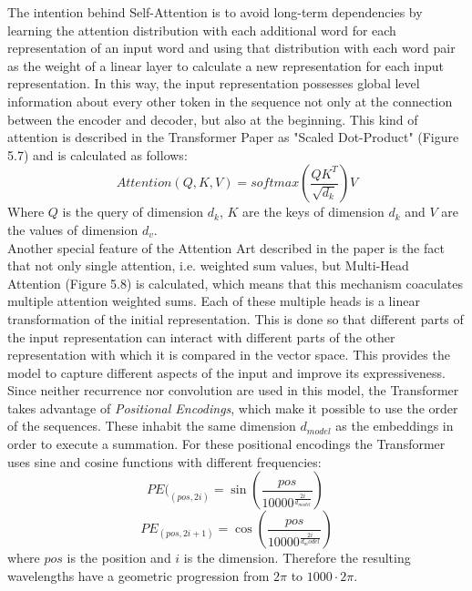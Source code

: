 \documentclass[a4paper, 11pt,titlepage,oneside,openany]{book}
\begin{document}
\noindent The intention behind Self-Attention is to avoid long-term dependencies by learning the attention distribution with each additional word for each representation of an input word and using that distribution with each word pair as the weight of a linear layer to calculate a new representation for each input representation. In this way, the input representation possesses global level information about every other token in the sequence not only at the connection between the encoder and decoder, but also at the beginning. This kind of attention is described in the Transformer Paper as "Scaled Dot-Product" (Figure 5.7) and is calculated as follows:
\[
Attention(Q,K,V)=softmax(\frac{QK^T}{\sqrt{d_k}})V
\]
Where $Q$ is the query of  dimension $d_k$, $K$ are the keys of dimension $d_k$ and $V$ are the values of dimension $d_v$. \\
\noindent Another special feature of the Attention Art described in the paper is the fact that not only single attention, i.e. weighted sum values, but Multi-Head Attention (Figure 5.8) is calculated, which means that this mechanism coaculates multiple attention weighted sums. Each of these multiple heads is a linear transformation of the initial representation. This is done so that different parts of the input representation can interact with different parts of the other representation with which it is compared in the vector space. This provides the model to capture different aspects of the input and improve its expressiveness.\\

\noindent Since neither recurrence nor convolution are used in this model, the Transformer takes advantage of \textit{Positional Encodings}, which make it possible to use the order of the sequences. These inhabit the same  dimension $d_{model}$ as the embeddings in order to execute a summation. For these positional encodings the Transformer uses sine and cosine functions with different frequencies:
\[
PE(_{(pos,2i)}=\sin (\frac{pos}{10000^{\frac{2i}{d_{model}}}})
\
\]
\[
PE_{(pos,2i+1)}=\cos (\frac{pos}{10000^{\frac{2i}{d_model}}})
\]
where $pos$ is the position and $i$ is the dimension. Therefore the resulting wavelengths have a geometric progression from $2\pi$ to $1000 \cdot 2\pi$.

\newpage
\end{document}
